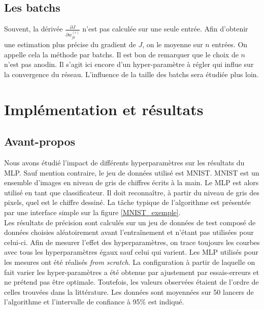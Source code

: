 \subsection{Les batchs}
Souvent, la dérivée $\frac{\partial J}{\partial w_{jk}^{(i)}}$ n'est pas calculée sur une seule entrée. Afin d'obtenir une estimation plus précise du gradient de $J$, on le moyenne sur $n$ entrées. On appelle cela la méthode par batchs. Il est bon de remarquer que le choix de $n$ n'est pas anodin. Il s'agit ici encore d'un hyper-paramètre à régler qui influe sur la convergence du réseau. L'influence de la taille des batchs sera étudiée plus loin.



\section{Implémentation et résultats}
\subsection{Avant-propos}
Nous avons étudié l'impact de différents hyperparamètres sur les résultats du MLP. Sauf mention contraire, le jeu de données utilisé est MNIST. MNIST est un ensemble d'images en niveau de gris de chiffres écrits à la main. Le MLP est alors utilisé en tant que classificateur. Il doit reconnaître, à partir du niveau de gris des pixels, quel est le chiffre dessiné. La tâche typique de l'algorithme est présentée par une interface simple sur la figure \ref{MNIST_exemple}.\\
Les résultats de précision sont calculés sur un jeu de données de test composé de données choisies aléatoirement avant l’entraînement et n'étant pas utilisées pour celui-ci. Afin de mesurer l'effet des hyperparamètres, on trace toujours les courbes avec tous les hyperparamètres égaux sauf celui qui varient.
Les MLP utilisés pour les mesures ont été réalisés \textit{from scratch}. La configuration à partir de laquelle on fait varier les hyper-paramètres a été obtenue par ajustement par essais-erreurs et ne prétend pas être optimale. Toutefois, les valeurs observées étaient de l'ordre de celles trouvées dans la littérature. Les données sont moyennées sur 50 lancers de l'algorithme et l'intervalle de confiance à 95\% est indiqué.

